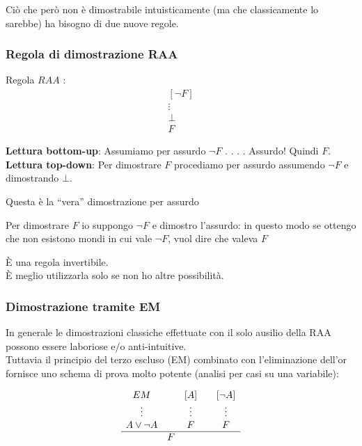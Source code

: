 \documentclass[
  a4paper,
]{article}
\begin{document}
Ciò che però non è dimostrabile intuisticamente (ma che classicamente lo
sarebbe) ha bisogno di due nuove regole.

\hypertarget{regola-di-dimostrazione-raa}{%
\subsubsection{Regola di dimostrazione
RAA}\label{regola-di-dimostrazione-raa}}

Regola \(RAA\) : \[
\begin{matrix} 
[\neg F] \\
\vdots \\
\bot \\
\hline
F 
\end{matrix}
\]

\textbf{Lettura bottom-up}: Assumiamo per assurdo \(\neg F\) . . . .
Assurdo! Quindi \(F\).\\
\textbf{Lettura top-down}: Per dimostrare \(F\) procediamo per assurdo
assumendo \(\neg F\) e dimostrando \(\bot\).

Questa è la ``vera'' dimostrazione per assurdo

Per dimostrare \(F\) io suppongo \(\neg F\) e dimostro l'assurdo: in
questo modo se ottengo che non esistono mondi in cui vale \(\neg F\),
vuol dire che valeva \(F\)

È una regola invertibile.\\
È meglio utilizzarla solo se non ho altre possibilità.

\hypertarget{dimostrazione-tramite-em}{%
\subsubsection{Dimostrazione tramite
EM}\label{dimostrazione-tramite-em}}

In generale le dimostrazioni classiche effettuate con il solo ausilio
della RAA possono essere laboriose e/o anti-intuitive.\\
Tuttavia il principio del terzo escluso (EM) combinato con
l'eliminazione dell'or fornisce uno schema di prova molto potente
(analisi per casi su una variabile):

\[
\begin{matrix} 
EM &&[A] && [\neg A] \\
\vdots && \vdots && \vdots \\
A \lor \neg A && F && F \\
\hline
& F
\end{matrix}
\]
\end{document}
